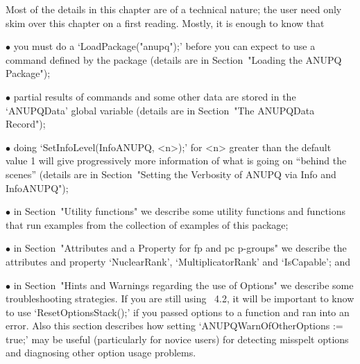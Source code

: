 

Most of the details in this chapter are of a technical nature;  the  user
need only skim over this chapter on a first reading. Mostly, it is enough
to know that

\beginlist%

\item{$\bullet$} 
you must do a `LoadPackage("anupq");' before you  can  expect  to  use  a
command defined by the {\ANUPQ} package (details are in  Section~"Loading
the ANUPQ Package");

\item{$\bullet$}
partial results of {\ANUPQ} commands and some other data  are  stored  in
the `ANUPQData' global variable (details are  in  Section~"The  ANUPQData
Record"); 

\item{$\bullet$} 
doing `SetInfoLevel(InfoANUPQ, <n>);' for <n> greater  than  the  default
value 1 will give progressively more information  of  what  is  going  on
``behind the scenes'' (details are in Section~"Setting the  Verbosity  of
ANUPQ via Info and InfoANUPQ");

\item{$\bullet$} 
in  Section~"Utility functions"  we describe  some utility  functions and
functions  that run  examples from  the  collection of  examples of  this
package;

\item{$\bullet$} 
in Section~"Attributes and a Property for fp and pc p-groups" we describe
the  attributes  and   property  `NuclearRank',  `MultiplicatorRank'  and
`IsCapable'; and

\item{$\bullet$} 
in Section~"Hints and Warnings regarding the use of Options" we  describe
some troubleshooting strategies. If you are still  using  {\GAP}~4.2,  it
will be important to know to use  `ResetOptionsStack();'  if  you  passed
options to a function and ran into an error. Also this section  describes
how  setting   `ANUPQWarnOfOtherOptions   :=   true;'   may   be   useful
(particularly for  novice  users)  for  detecting  misspelt  options  and
diagnosing other option usage problems.

